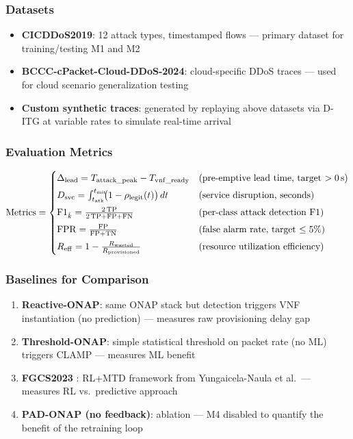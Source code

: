 \documentclass[12pt, a4paper]{article}
\begin{document}
\subsubsection{Datasets}
\begin{itemize}[noitemsep]
  \item \textbf{CICDDoS2019}: 12 attack types, timestamped flows --- primary
        dataset for training/testing M1 and M2
  \item \textbf{BCCC-cPacket-Cloud-DDoS-2024}: cloud-specific DDoS traces ---
        used for cloud scenario generalization testing
  \item \textbf{Custom synthetic traces}: generated by replaying above
        datasets via D-ITG at variable rates to simulate real-time arrival
\end{itemize}

\subsubsection{Evaluation Metrics}
\begin{equation}
\text{Metrics} =
\begin{cases}
  \Delta_{\mathrm{lead}} = T_{\mathrm{attack\_peak}} - T_{\mathrm{vnf\_ready}}
    & \text{(pre-emptive lead time, target $> 0$\,s)} \\[4pt]
  D_{\mathrm{svc}} = \int_{t_{\mathrm{atk}}}^{t_{\mathrm{mit}}}
    \!\!\bigl(1 - \rho_{\mathrm{legit}}(t)\bigr)\,dt
    & \text{(service disruption, seconds)} \\[4pt]
  \text{F1}_{\hat{k}} = \frac{2\,\mathrm{TP}}{2\,\mathrm{TP} + \mathrm{FP} + \mathrm{FN}}
    & \text{(per-class attack detection F1)} \\[4pt]
  \mathrm{FPR} = \frac{\mathrm{FP}}{\mathrm{FP} + \mathrm{TN}}
    & \text{(false alarm rate, target $\leq 5\%$)} \\[4pt]
  R_{\mathrm{eff}} = 1 - \frac{R_{\mathrm{wasted}}}{R_{\mathrm{provisioned}}}
    & \text{(resource utilization efficiency)}
\end{cases}
\label{eq:metrics}
\end{equation}

\subsubsection{Baselines for Comparison}
\begin{enumerate}[noitemsep, label=\textbf{B\arabic*.}]
  \item \textbf{Reactive-ONAP}: same ONAP stack but detection triggers VNF
        instantiation (no prediction) --- measures raw provisioning delay gap
  \item \textbf{Threshold-ONAP}: simple statistical threshold on packet rate
        (no ML) triggers CLAMP --- measures ML benefit
  \item \textbf{FGCS2023} \cite{yungaicela2023}: RL+MTD framework from
        Yungaicela-Naula et al.\ --- measures RL vs.\ predictive approach
  \item \textbf{PAD-ONAP (no feedback)}: ablation --- M4 disabled to
        quantify the benefit of the retraining loop
\end{enumerate}
\end{document}
